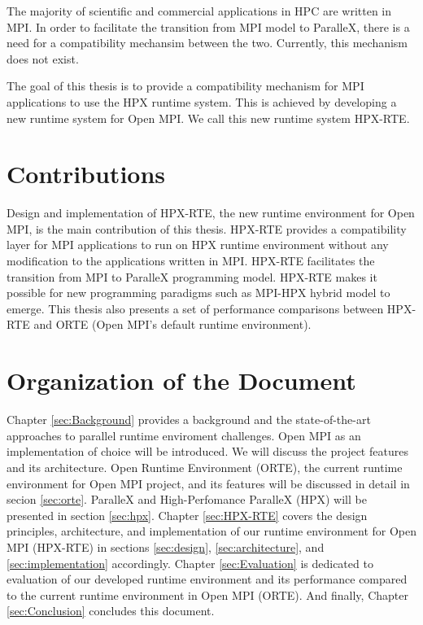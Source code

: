 The majority of scientific and commercial applications in HPC are written in MPI. In order to facilitate the transition from MPI model to ParalleX, there is a need for a compatibility mechansim between the two. Currently, this mechanism does not exist.

The goal of this thesis is to provide a compatibility mechanism for MPI applications to use the HPX runtime system. This is achieved by developing a new runtime system for Open MPI. We call this new runtime system HPX-RTE.

\section{Contributions}
Design and implementation of HPX-RTE, the new runtime environment for Open MPI, is the main contribution of this thesis. HPX-RTE provides a compatibility layer for MPI applications to run on HPX runtime environment without any modification to the applications written in MPI. HPX-RTE facilitates the transition from MPI to ParalleX programming model. HPX-RTE makes it possible for new programming paradigms such as MPI-HPX hybrid model to emerge. This thesis also presents a set of performance comparisons between HPX-RTE and ORTE (Open MPI's default runtime environment).

\section{Organization of the Document}
Chapter \ref{sec:Background} provides a background and the state-of-the-art approaches to parallel runtime enviroment challenges. Open MPI as an implementation of choice will be introduced. We will discuss the project features and its architecture. Open Runtime Environment (ORTE), the current runtime environment for Open MPI project, and its features will be discussed in detail in secion \ref{sec:orte}. ParalleX and High-Perfomance ParalleX (HPX) will be presented in section \ref{sec:hpx}. Chapter \ref{sec:HPX-RTE} covers the design principles, architecture, and implementation of our runtime environment for Open MPI (HPX-RTE) in sections \ref{sec:design}, \ref{sec:architecture}, and \ref{sec:implementation} accordingly. Chapter \ref{sec:Evaluation} is dedicated to evaluation of our developed runtime environment and its performance compared to the current runtime environment in Open MPI (ORTE). And finally, Chapter \ref{sec:Conclusion} concludes this document.
